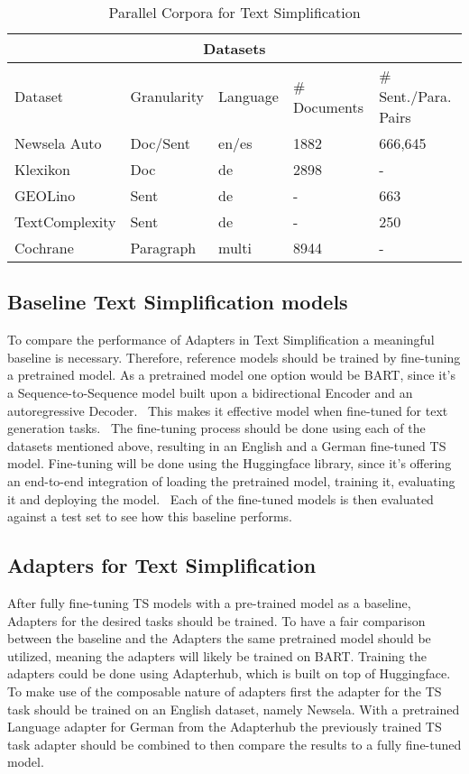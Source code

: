 \the\textwidth

\begin{table}[h!]
    \centering
    \begin{tabular}{ |p{3cm}|p{2.5cm}|p{2.5cm}|p{2.5cm}|p{2.5cm}| }
        \hline
        \multicolumn{5}{|c|}{Datasets} \\
        \hline
        Dataset & Granularity & Language & \# Documents & \# Sent./Para. Pairs \\
        \hline
        Newsela Auto & Doc/Sent & en/es & 1882 & 666,645 \\
        Klexikon & Doc & de & 2898 & - \\
        GEOLino & Sent & de & - & 663 \\
        TextComplexity & Sent & de & - & 250 \\
        Cochrane & Paragraph & multi & 8944 & - \\
        \hline
    \end{tabular}
    \caption{Parallel Corpora for Text Simplification}
    \label{table:datasets}
\end{table}


\subsection{Baseline Text Simplification models}
To compare the performance of Adapters in Text Simplification a meaningful baseline is necessary.
Therefore, reference models should be trained by fine-tuning a pretrained model.
As a pretrained model one option would be BART, since it's a Sequence-to-Sequence model
built upon a bidirectional Encoder and an autoregressive Decoder.~\cite{Lewis2019}
This makes it effective model when fine-tuned for text generation tasks.~\cite{Lewis2019}
The fine-tuning process should be done using each of the datasets mentioned above,
resulting in an English and a German fine-tuned TS model.
Fine-tuning will be done using the Huggingface library, since it's offering an end-to-end
integration of loading the pretrained model, training it, evaluating it and deploying the model.~\cite{Huggingface2023}
Each of the fine-tuned models is then evaluated against a test set to see how this
baseline performs.

\subsection{Adapters for Text Simplification}
After fully fine-tuning TS models with a pre-trained model as a baseline,
Adapters for the desired tasks should be trained.
To have a fair comparison between the baseline and the Adapters the same pretrained model
should be utilized, meaning the adapters will likely be trained on BART.
Training the adapters could be done using Adapterhub, which is built on top of Huggingface.~\cite{Pfeiffer2023}
To make use of the composable nature of adapters first the adapter for the TS task should be trained
on an English dataset, namely Newsela.
With a pretrained Language adapter for German from the Adapterhub the previously trained TS task adapter should be combined
to then compare the results to a fully fine-tuned model.


